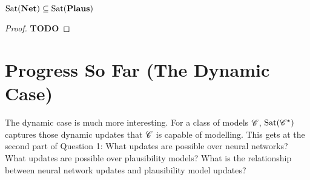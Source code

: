 \documentclass[letterpaper]{article}
\begin{document}
\begin{proposition}
    $\mathrm{Sat}( \textrm{\textbf{Net}} ) \subseteq \mathrm{Sat}( \textrm{\textbf{Plaus}} )$
\end{proposition}
\begin{proof}
    \textbf{TODO}
\end{proof}




\section*{Progress So Far (The Dynamic Case)}

The dynamic case is much more interesting.  For a class of models $\mathscr{C}$, $\mathrm{Sat}( \mathscr{C}^\star )$ captures those dynamic updates that $\mathscr{C}$ is capable of modelling.  This gets at the second part of Question 1: What updates are possible over neural networks?  What updates are possible over plausibility models?  What is the relationship between neural network updates and plausibility model updates?
\end{document}
